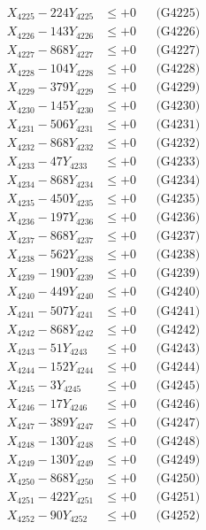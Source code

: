 \documentclass[a4paper,10pt]{article}
\begin{document}
{\begin{align}
X_{4225} - 224Y_{4225} &\leq +0 && \text{(G4225)} \\
X_{4226} - 143Y_{4226} &\leq +0 && \text{(G4226)} \\
X_{4227} - 868Y_{4227} &\leq +0 && \text{(G4227)} \\
X_{4228} - 104Y_{4228} &\leq +0 && \text{(G4228)} \\
X_{4229} - 379Y_{4229} &\leq +0 && \text{(G4229)} \\
X_{4230} - 145Y_{4230} &\leq +0 && \text{(G4230)} \\
\allowbreak
X_{4231} - 506Y_{4231} &\leq +0 && \text{(G4231)} \\
X_{4232} - 868Y_{4232} &\leq +0 && \text{(G4232)} \\
X_{4233} - 47Y_{4233} &\leq +0 && \text{(G4233)} \\
X_{4234} - 868Y_{4234} &\leq +0 && \text{(G4234)} \\
X_{4235} - 450Y_{4235} &\leq +0 && \text{(G4235)} \\
X_{4236} - 197Y_{4236} &\leq +0 && \text{(G4236)} \\
X_{4237} - 868Y_{4237} &\leq +0 && \text{(G4237)} \\
X_{4238} - 562Y_{4238} &\leq +0 && \text{(G4238)} \\
X_{4239} - 190Y_{4239} &\leq +0 && \text{(G4239)} \\
X_{4240} - 449Y_{4240} &\leq +0 && \text{(G4240)} \\
\allowbreak
X_{4241} - 507Y_{4241} &\leq +0 && \text{(G4241)} \\
X_{4242} - 868Y_{4242} &\leq +0 && \text{(G4242)} \\
X_{4243} - 51Y_{4243} &\leq +0 && \text{(G4243)} \\
X_{4244} - 152Y_{4244} &\leq +0 && \text{(G4244)} \\
X_{4245} - 3Y_{4245} &\leq +0 && \text{(G4245)} \\
X_{4246} - 17Y_{4246} &\leq +0 && \text{(G4246)} \\
X_{4247} - 389Y_{4247} &\leq +0 && \text{(G4247)} \\
X_{4248} - 130Y_{4248} &\leq +0 && \text{(G4248)} \\
X_{4249} - 130Y_{4249} &\leq +0 && \text{(G4249)} \\
X_{4250} - 868Y_{4250} &\leq +0 && \text{(G4250)} \\
\allowbreak
X_{4251} - 422Y_{4251} &\leq +0 && \text{(G4251)} \\
X_{4252} - 90Y_{4252} &\leq +0 && \text{(G4252)} \\

\end{align}}
\end{document}
